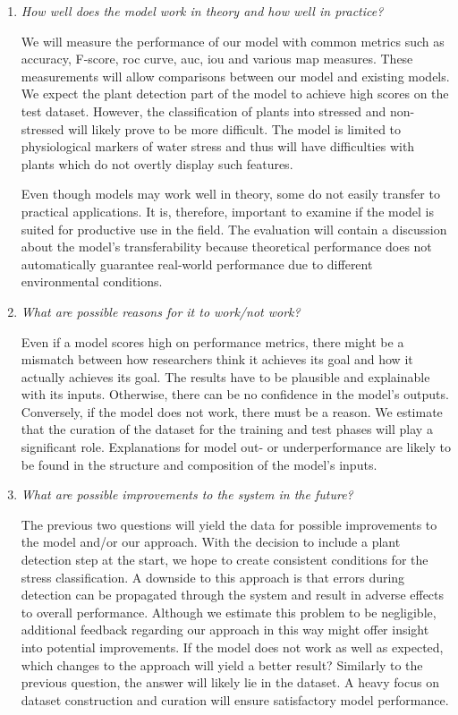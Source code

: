 \documentclass[final]{vutinfth} %
\begin{document}
\begin{enumerate}
\item \emph{How well does the model work in theory and how well in
    practice?}

  We will measure the performance of our model with common metrics
  such as accuracy, F-score, \gls{roc} curve, \gls{auc}, \gls{iou} and
  various \gls{map} measures. These measurements will allow
  comparisons between our model and existing models. We expect the
  plant detection part of the model to achieve high scores on the test
  dataset. However, the classification of plants into stressed and
  non-stressed will likely prove to be more difficult. The model is
  limited to physiological markers of water stress and thus will have
  difficulties with plants which do not overtly display such features.

  Even though models may work well in theory, some do not easily
  transfer to practical applications. It is, therefore, important to
  examine if the model is suited for productive use in the field. The
  evaluation will contain a discussion about the model's
  transferability because theoretical performance does not
  automatically guarantee real-world performance due to different
  environmental conditions.
\item \emph{What are possible reasons for it to work/not work?}

  Even if a model scores high on performance metrics, there might be a
  mismatch between how researchers think it achieves its goal and how
  it actually achieves its goal. The results have to be plausible and
  explainable with its inputs. Otherwise, there can be no confidence
  in the model's outputs. Conversely, if the model does not work,
  there must be a reason. We estimate that the curation of the dataset
  for the training and test phases will play a significant
  role. Explanations for model out- or underperformance are likely to
  be found in the structure and composition of the model's inputs.
\item \emph{What are possible improvements to the system in the
    future?}

  The previous two questions will yield the data for possible
  improvements to the model and/or our approach. With the decision to
  include a plant detection step at the start, we hope to create
  consistent conditions for the stress classification. A downside to
  this approach is that errors during detection can be propagated
  through the system and result in adverse effects to overall
  performance. Although we estimate this problem to be negligible,
  additional feedback regarding our approach in this way might offer
  insight into potential improvements. If the model does not work as
  well as expected, which changes to the approach will yield a better
  result? Similarly to the previous question, the answer will likely
  lie in the dataset. A heavy focus on dataset construction and
  curation will ensure satisfactory model performance.
\end{enumerate}
\end{document}
